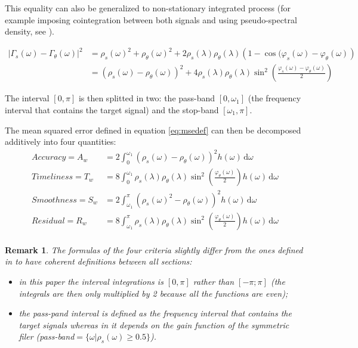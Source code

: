 \documentclass[
  12pt,
  ,
  a4paper]{article}
\newcommand\1{\mathds{1}}
\newcommand\ud{\,\mathrm{d}}
\newtheorem*{remark}{Remark}
\begin{document}
This equality can also be generalized to non-stationary integrated process (for example imposing cointegration between both signals and using pseudo-spectral density, see \textcite{optimrtfWMR2013}).

\begin{align}
\left|\Gamma_s(\omega)-\Gamma_\theta(\omega)\right|^{2} & =\rho_s(\omega)^{2}+\rho_\theta(\omega)^{2}+2\rho_s(\lambda)\rho_\theta(\lambda)\left(1-\cos(\varphi_s(\omega)-\varphi_\theta(\omega)\right) \nonumber\\
 & =\left(\rho_s(\omega)-\rho_\theta(\omega)\right)^{2}+4\rho_s(\lambda)\rho_\theta(\lambda)\sin^{2}\left(\frac{\varphi_s(\omega)-\varphi_\theta(\omega)}{2}\right)
 \label{eq:msedecomp}
\end{align}

The interval \([0,\pi]\) is then splitted in two: the pass-band \([0,\omega_1]\) (the frequency interval that contains the target signal) and the stop-band \([\omega_1,\pi]\).

The mean squared error defined in equation \eqref{eq:msedef} can then be decomposed additively into four quantities:
\begin{align*}
Accuracy =A_w&= 2\int_0^{\omega_1}\left(\rho_s(\omega)-\rho_\theta(\omega)\right)^{2}h(\omega)\ud\omega\\
Timeliness =T_w&= 8\int_0^{\omega_1}\rho_s(\lambda)\rho_\theta(\lambda)\sin^{2}\left(\frac{\varphi_\theta(\omega)}{2}\right)h(\omega)\ud\omega\\
Smoothness =S_w&= 2\int_{\omega_1}^\pi\left(\rho_s(\omega)^{2}-\rho_\theta(\omega)\right)^{2}h(\omega)\ud\omega\\
Residual =R_w&= 8\int_{\omega_1}^\pi\rho_s(\lambda)\rho_\theta(\lambda)\sin^{2}\left(\frac{\varphi_\theta(\omega)}{2}\right)h(\omega)\ud\omega\\
\end{align*}

\begin{remark}

The formulas of the four criteria slightly differ from the ones defined in \textcite{trilemmaWMR2019} to have coherent definitions between all sections:

\begin{itemize}
\item
  in this paper the interval integrations is \([0,\pi]\) rather than \([-\pi;\pi]\) (the integrals are then only multiplied by 2 because all the functions are even);
\item
  the pass-pand interval is defined as the frequency interval that contains the target signals whereas in \textcite{trilemmaWMR2019} it depends on the gain function of the symmetric filer (pass-band\(=\{\omega |\rho_s(\omega)\geq 0.5\}\)).
\end{itemize}

\end{remark}
\end{document}
